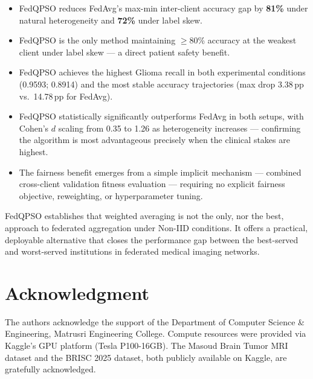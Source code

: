 \documentclass[conference]{IEEEtran}
\begin{document}
\begin{itemize}
    \item FedQPSO reduces FedAvg's max-min inter-client accuracy gap by
    \textbf{81\%} under natural heterogeneity and \textbf{72\%} under
    label skew.

    \item FedQPSO is the only method maintaining $\geq$80\% accuracy at
    the weakest client under label skew — a direct patient safety benefit.

    \item FedQPSO achieves the highest Glioma recall in both experimental
    conditions (0.9593; 0.8914) and the most stable accuracy trajectories
    (max drop 3.38\,pp vs.\ 14.78\,pp for FedAvg).

    \item FedQPSO statistically significantly outperforms FedAvg in both
    setups, with Cohen's $d$ scaling from 0.35 to 1.26 as heterogeneity
    increases — confirming the algorithm is most advantageous precisely
    when the clinical stakes are highest.

    \item The fairness benefit emerges from a simple implicit mechanism
    — combined cross-client validation fitness evaluation — requiring no
    explicit fairness objective, reweighting, or hyperparameter tuning.
\end{itemize}

FedQPSO establishes that weighted averaging is not the only, nor the best,
approach to federated aggregation under Non-IID conditions. It offers a
practical, deployable alternative that closes the performance gap between
the best-served and worst-served institutions in federated medical imaging
networks.

\section*{Acknowledgment}
The authors acknowledge the support of the Department of Computer Science \&
Engineering, Matrusri Engineering College. Compute resources were provided
via Kaggle's GPU platform (Tesla P100-16GB). The Masoud Brain Tumor MRI
dataset and the BRISC 2025 dataset, both publicly available on Kaggle, are
gratefully acknowledged.
\end{document}
